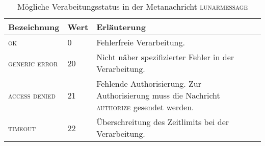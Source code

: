 \documentclass[ngerman,11pt]{report}
\begin{document}
\begin{table}[]
\centering
\caption{Mögliche Verabeitungsstatus in der Metanachricht \textsc{lunarmessage}}
\label{table:messagesStatus}
\begin{tabularx}{\textwidth}{l|l|X}
Bezeichnung            & Wert & Erläuterung \\ \hline
\textsc{ok}            & 0    & Fehlerfreie Verarbeitung. \\
\textsc{generic error} & 20   & Nicht näher spezifizierter Fehler in der Verarbeitung.  \\
\textsc{access denied} & 21   & Fehlende Authorisierung. Zur Authorisierung muss die
                                Nachricht \textsc{authorize} gesendet werden. \\
\textsc{timeout}       & 22   & Überschreitung des Zeitlimits bei der Verarbeitung.
\end{tabularx}
\end{table}
\end{document}
